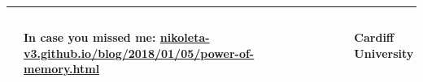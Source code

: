 \documentclass[usenames,dvipsnames,t]{beamer}
\begin{document}
\hrule height 3pt
\begin{columns}
    \begin{column}{.1\linewidth}

        \centering
    \end{column}
    \begin{column}{.55\linewidth}

        \centering
        \textbf{ In case you missed me: \url{nikoleta-v3.github.io/blog/2018/01/05/power-of-memory.html}}
    \end{column}
    \begin{column}{.1\linewidth}

        \centering
    \end{column}
    \begin{column}{.1\linewidth}

        \centering
        \textbf{Cardiff University}
    \end{column}
\end{columns}
\end{document}
